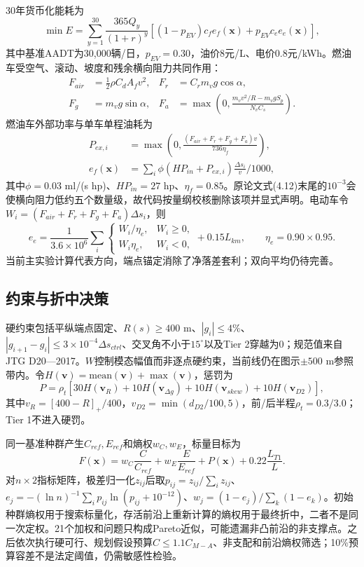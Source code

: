 \documentclass[preprint,12pt]{elsarticle}
\begin{document}
30年货币化能耗为
\begin{equation}
\min E=\sum_{y=1}^{30}\frac{365Q_y}{(1+r)^y}
\left[(1-p_{EV})c_fe_f(\bm x)+p_{EV}c_ee_e(\bm x)\right],
\end{equation}
其中基准AADT为30,000辆/日，$p_{EV}=0.30$，油价8元/L、电价0.8元/kWh。燃油车受空气、滚动、坡度和残余横向阻力共同作用：
\begin{align}
F_{air}&=\tfrac12\rho C_dA_fv^2, & F_r&=C_rm_vg\cos\alpha,\\
F_g&=m_vg\sin\alpha, &
F_a&=\max\left(0,\frac{m_vv^2/R-m_vgS_p}{N_vC_s}\right).
\end{align}
燃油车外部功率与单车单程油耗为
\begin{align}
P_{ex,i}&=\max\left(0,\frac{(F_{air}+F_r+F_g+F_a)v}{736\eta_f}\right),\\
e_f(\bm x)&=\sum_i\phi(HP_{in}+P_{ex,i})\frac{\Delta s_i}{v}/1000,
\end{align}
其中$\phi=0.03$ ml/(s hp)、$HP_{in}=27$ hp、$\eta_f=0.85$。原论文式(4.12)末尾的$10^{-3}$会使横向阻力低约五个数量级，故代码按量纲校核删除该项并显式声明。电动车令$W_i=(F_{air}+F_r+F_g+F_a)\Delta s_i$，则
\begin{equation}
e_e=\frac{1}{3.6\times10^6}\sum_i
\begin{cases}W_i/\eta_e,&W_i\geq0,\\W_i\eta_e,&W_i<0,\end{cases}
+0.15L_{km},\qquad\eta_e=0.90\times0.95.
\end{equation}
当前主实验计算代表方向，端点锚定消除了净落差套利；双向平均仍待完善。

\subsection{约束与折中决策}

硬约束包括平纵端点固定、$R(s)\geq400$ m、$|g_i|\leq4\%$、$|g_{i+1}-g_i|\leq3\times10^{-4}\Delta s_{ctrl}$、交叉角不小于$15^\circ$以及Tier 2穿越为0；规范值来自JTG D20—2017\cite{jtgd20}。$W$控制模态幅值而非逐点硬约束，当前线仍在图示$\pm500$ m参照带内。令$H(\bm v)=\mathrm{mean}(\bm v)+\max(\bm v)$，惩罚为
\begin{equation}
P=\rho_t[30H(\bm v_R)+10H(\bm v_{\Delta g})+10H(\bm v_{skew})+10H(\bm v_{D2})],
\end{equation}
其中$v_R=[400-R]_+/400$，$v_{D2}=\min(d_{D2}/100,5)$，前/后半程$\rho_t=0.3/3.0$；Tier 1不进入硬罚。

同一基准种群产生$C_{ref},E_{ref}$和熵权$w_C,w_E$，标量目标为
\begin{equation}
F(\bm x)=w_C\frac{C}{C_{ref}}+w_E\frac{E}{E_{ref}}+P(\bm x)
+0.22\frac{L_{T1}}{L}.
\end{equation}
对$n\times2$指标矩阵，极差归一化$z_{ij}$后取$p_{ij}=z_{ij}/\sum_i z_{ij}$、$e_j=-(\ln n)^{-1}\sum_i p_{ij}\ln(p_{ij}+10^{-12})$、$w_j=(1-e_j)/\sum_k(1-e_k)$。初始种群熵权用于搜索标量化，存活前沿上重新计算的熵权用于最终折中，二者不是同一次定权。21个加权和问题只构成Pareto近似，可能遗漏非凸前沿的非支撑点。之后依次执行硬可行、规划假设预算$C\leq1.1C_{M-A}$、非支配和前沿熵权筛选；10\%预算容差不是法定阈值，仍需敏感性检验。
\end{document}
